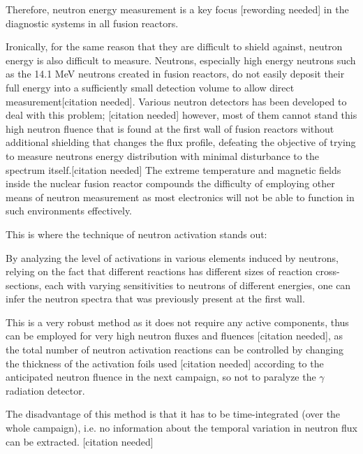 \documentclass[a4paper, 12pt]{article}
\begin{document}
Therefore, neutron energy measurement is a key focus [rewording needed] in the diagnostic systems in all fusion reactors.

Ironically, for the same reason that they are difficult to shield against, neutron energy is also difficult to measure. Neutrons, especially high energy neutrons such as the 14.1 MeV neutrons created in fusion reactors, do not easily deposit their full energy into a sufficiently small detection volume to allow direct measurement[citation needed]. Various neutron detectors has been developed to deal with this problem;
[citation needed] %
however, most of them cannot stand this high neutron fluence that is found at the first wall of fusion reactors without additional shielding that changes the flux profile, defeating the objective of trying to measure neutrons energy distribution with minimal disturbance to the spectrum itself.[citation needed]
The extreme temperature and magnetic fields inside the nuclear fusion reactor compounds the difficulty of employing other means of neutron measurement as most electronics will not be able to function in such environments effectively.

This is where the technique of neutron activation stands out: 

By analyzing the level of activations in various elements induced by neutrons, relying on the fact that different reactions has different sizes of reaction cross-sections, each with varying sensitivities to neutrons of different energies, one can infer the neutron spectra that was previously present at the first wall.

This is a very robust method as it does not require any active components, thus can be employed for very high neutron fluxes and fluences [citation needed], as the total number of neutron activation reactions can be controlled by changing the thickness of the activation foils used [citation needed] according to the anticipated neutron fluence in the next campaign, so not to paralyze the $\gamma$ radiation detector.

The disadvantage of this method is that it has to be time-integrated (over the whole campaign), i.e. no information about the temporal variation in neutron flux can be extracted. [citation needed]
\end{document}
